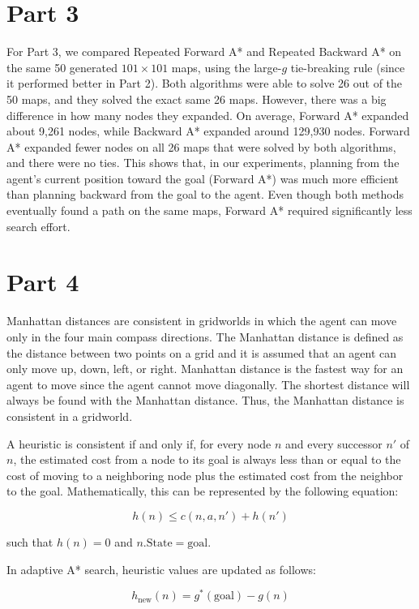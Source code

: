\documentclass[11pt]{article}
\begin{document}
\section*{Part 3}

For Part 3, we compared Repeated Forward A* and Repeated Backward A* on the same 50 generated $101 \times 101$ maps, using the large-$g$ tie-breaking rule (since it performed better in Part 2). Both algorithms were able to solve 26 out of the 50 maps, and they solved the exact same 26 maps. However, there was a big difference in how many nodes they expanded. On average, Forward A* expanded about 9,261 nodes, while Backward A* expanded around 129,930 nodes. Forward A* expanded fewer nodes on all 26 maps that were solved by both algorithms, and there were no ties. This shows that, in our experiments, planning from the agent’s current position toward the goal (Forward A*) was much more efficient than planning backward from the goal to the agent. Even though both methods eventually found a path on the same maps, Forward A* required significantly less search effort.

\section*{Part 4}

Manhattan distances are consistent in gridworlds in which the agent can move only in the four main compass directions. The Manhattan distance is defined as the distance between two points on a grid and it is assumed that an agent can only move up, down, left, or right. Manhattan distance is the fastest way for an agent to move since the agent cannot move diagonally. The shortest distance will always be found with the Manhattan distance. Thus, the Manhattan distance is consistent in a gridworld. 

A heuristic is consistent if and only if, for every node $n$ and every successor $n'$ of $n$, the estimated cost from a node to its goal is always less than or equal to the cost of moving to a neighboring node plus the estimated cost from the neighbor to the goal. Mathematically, this can be represented by the following equation:

\[
h(n) \leq c(n, a, n') + h(n')
\]

such that $h(n) = 0$ and $n.\text{State} = \text{goal}$.

In adaptive A* search, heuristic values are updated as follows:

\[
h_{\text{new}}(n) = g^*(\text{goal}) - g(n)
\]
\end{document}
